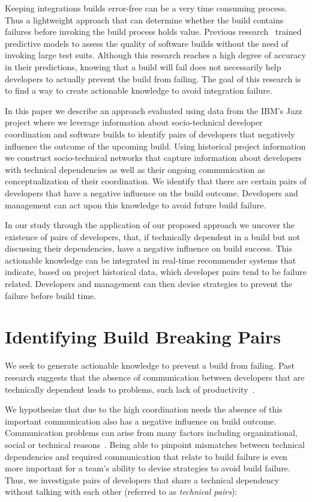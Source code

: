 \documentclass[conference]{IEEEtran}
\begin{document}
Keeping integrations builds error-free can be a very time consuming
process. 
Thus a lightweight approach that can determine whether the build contains
failures before invoking the build process holds value. Previous
research~\cite{wolf:icse:2009,hassan:ase:2006} trained predictive models to assess the quality of software builds without the need of invoking large test
suits. Although this research
reaches a high degree of accuracy in their predictions, knowing that a
build will fail does not necessarily help developers to actually prevent
the build from failing.
The goal of this research is to find a way to create actionable knowledge to avoid
integration failure.

In this paper we describe an approach evaluated using data from the IBM's Jazz project where we leverage
information about socio-technical developer coordination and software builds to
identify pairs of developers that negatively influence the outcome of the
upcoming build. Using historical project information we construct socio-technical
networks that capture information about developers with technical dependencies
as well as their ongoing communication as conceptualization of their coordination.
We identify that there are certain pairs of developers that have a
negative influence on the build outcome. Developers and management can
act upon this knowledge to avoid future build failure.

In our study through the application of our proposed approach we uncover the existence of pairs of
developers, that, if technically dependent in a build but not discussing their
dependencies, have a negative influence on build success. This
actionable knowledge can be integrated in real-time recommender systems that
indicate, based on project historical data, which developer pairs tend to be
failure related. Developers and management can then devise strategies to
prevent the failure before build time. 



\section{Identifying Build Breaking Pairs}
\label{sec:pattern}
We seek to generate actionable knowledge to
prevent a build from failing. Past research suggests that the absence of
communication between developers that are technically dependent leads to
problems, such lack of productivity~\cite{cataldo:esem:2008}.


We hypothesize that due to the high coordination needs the absence of this
important communication also has a negative influence on build outcome. Communication problems can arise from many factors including organizational,
social or technical reasons~\cite{herbsleb:icse:1999}. Being able to pinpoint
mismatches between technical dependencies and required communication that
relate to build failure is even more important for a team's
ability to devise strategies to avoid build failure. Thus, we
investigate pairs of developers that share a technical dependency without talking
with each other (referred to as \emph{technical pairs}):
\ \\ \
\end{document}
